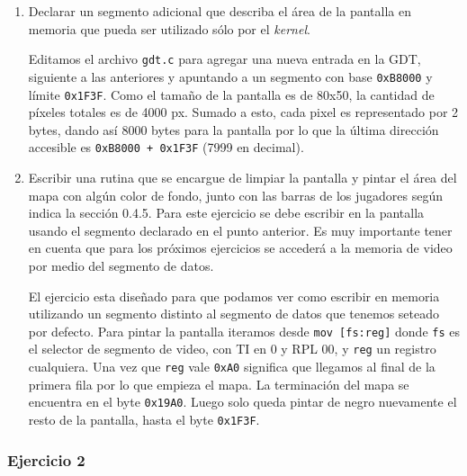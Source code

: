 \documentclass[a4paper]{article}
\begin{document}
\begin{enumerate}[label=\alph*)]
\item Declarar un segmento adicional que describa el \'area de la pantalla en memoria que pueda ser utilizado s\'olo por el \textit{kernel}.

Editamos el archivo \texttt{gdt.c} para agregar una nueva entrada en la GDT, siguiente a las anteriores y apuntando a un segmento con base \texttt{0xB8000} y l\'imite \texttt{0x1F3F}. Como el tama\~no de la pantalla es de 80x50, la cantidad de p\'ixeles totales es de 4000 px. Sumado a esto, cada pixel es representado por 2 bytes, dando as\'i 8000 bytes para la pantalla por lo que la \'ultima direcci\'on accesible es \texttt{0xB8000 + 0x1F3F} (7999 en decimal).

\item Escribir una rutina que se encargue de limpiar la pantalla y pintar el área del mapa con algún color de fondo, junto con las barras de los jugadores según indica la sección 0.4.5. Para este ejercicio se debe escribir en la pantalla usando el segmento declarado en el punto anterior. Es muy importante tener en cuenta que para los próximos ejercicios se accederá a la memoria de video por medio del segmento de datos.

El ejercicio esta dise\~nado para que podamos ver como escribir en memoria utilizando un segmento distinto al segmento de datos que tenemos seteado por defecto. Para pintar la pantalla iteramos desde \texttt{mov [fs:reg]} donde \texttt{fs} es el selector de segmento de video, con TI en 0 y RPL 00, y \texttt{reg} un registro cualquiera. Una vez que \texttt{reg} vale \texttt{0xA0} significa que llegamos al final de la primera fila por lo que empieza el mapa. La terminaci\'on del mapa se encuentra en el byte \texttt{0x19A0}. Luego solo queda pintar de negro nuevamente el resto de la pantalla, hasta el byte \texttt{0x1F3F}. 
 
\end{enumerate}

\subsubsection{Ejercicio 2}
\end{document}
